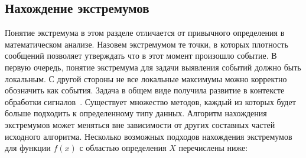 \documentclass[12pt, a4paper]{article}
\begin{document}
  \subsection{Нахождение экстремумов}
  Понятие экстремума в этом разделе отличается от привычного определения в математическом анализе. Назовем экстремумом те точки, в которых плотность сообщений позволяет утверждать что в этот момент произошло событие. В первую очередь, понятие экстремума для задачи выявления событий должно быть локальным. С другой стороны не все локальные максимумы можно корректно обозначить как события. Задача в общем виде получила развитие в контексте обработки сигналов~\cite{peak-detection}. Существует множество методов, каждый из которых будет больше подходить к определенному типу данных. Алгоритм нахождения экстремумов может меняться вне зависимости от других составных частей исходного алгоритма. Несколько возможных подходов нахождения экстремумов для функции $f(x)$ с областью определения $X$ перечислены ниже:
\end{document}
